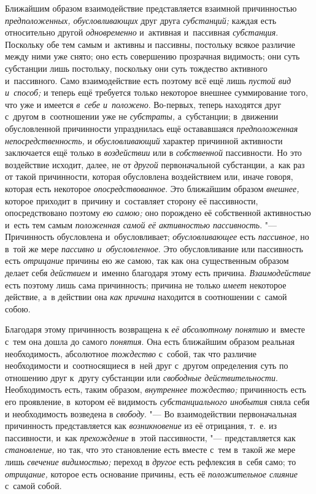 Ближайшим образом взаимодействие представляется взаимной причинностью
{\em предположенных, обусловливающих} друг друга
{\em субстанций;} каждая есть относительно другой
{\em одновременно} и~активная и~пассивная
{\em субстанция}. Поскольку обе тем самым и~активны и
пассивны, постольку всякое различие между ними уже снято; оно есть
совершению прозрачная видимость; они суть субстанции лишь постольку,
поскольку они суть тождество активного и~пассивного. Само взаимодействие
есть поэтому всё ещё лишь {\em пустой вид и~способ;} и
теперь ещё требуется только некоторое внешнее суммирование того, что уже и
имеется {\em в~себе и~положено}. Во-первых, теперь
находятся друг с~другом в~соотношении уже не
{\em субстраты,} а~субстанции; в~движении обусловленной
причинности упразднилась ещё остававшаяся
{\em предположенная непосредственность,} и
{\em обусловливающий} характер причинной активности
заключается ещё только в {\em воздействии} или в
{\em собственной} пассивности. Но это воздействие
исходит, далее, не от {\em другой} первоначальной
субстанции, а~как раз от такой причинности, которая обусловлена
воздействием или, иначе говоря, которая есть некоторое
{\em опосредствованное}. Это ближайшим образом
{\em внешнее,} которое приходит в~причину и~составляет
сторону её пассивности, опосредствовано поэтому {\em ею
самою;} оно порождено её собственной активностью и~есть тем самым
{\em положенная самой её активностью пассивность}. "---
Причинность обусловлена и~обусловливает; {\em обусловливающее} есть
{\em пассивное,} но в~той же мере
{\em пассивно и~обусловленное}. Это обусловливание или
пассивность есть {\em отрицание} причины ею же самою,
так как она существенным образом делает себя
{\em действием} и~именно благодаря этому есть причина.
{\em Взаимодействие} есть поэтому лишь сама
причинность; причина не только {\em имеет} некоторое
действие, а~в действии она {\em как причина} находится
в соотношении с~самой собою.

Благодаря этому причинность возвращена к {\em её
абсолютному понятию} и~вместе с~тем она дошла до самого
{\em понятия}. Она есть ближайшим образом реальная
необходимость, абсолютное {\em тождество} с~собой, так
что различие необходимости и~соотносящиеся в~ней друг с~другом определения
суть по отношению друг к~другу субстанции или
{\em свободные действительности}. Необходимость есть,
таким образом, {\em внутреннее тождество;} причинность
есть его проявление, в~котором её видимость
{\em субстанциального инобытия} сняла себя и
необходимость возведена в {\em свободу}. "--- Во
взаимодействии первоначальная причинность представляется как
{\em возникновение} из её отрицания, т.~е. из
пассивности, и~как {\em прехождение} в~этой
пассивности, "--- представляется как {\em становление,} но
так, что это становление есть вместе с~тем в~такой же мере лишь
{\em свечение видимостью;} переход в
{\em другое} есть рефлексия в~себя само; то
{\em отрицание,} которое есть основание причины, есть
её {\em положительное слияние} с~самой собой.


